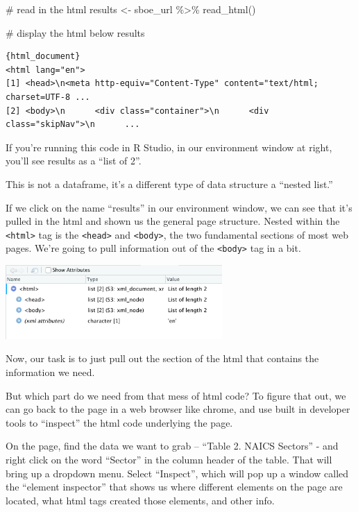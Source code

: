 \documentclass[
  letterpaper,
  DIV=11,
  numbers=noendperiod]{scrreprt}
\newenvironment{Shaded}{\begin{snugshade}}{\end{snugshade}}
\newcommand{\CommentTok}[1]{\textcolor[rgb]{0.37,0.37,0.37}{#1}}
\newcommand{\FunctionTok}[1]{\textcolor[rgb]{0.28,0.35,0.67}{#1}}
\newcommand{\NormalTok}[1]{\textcolor[rgb]{0.00,0.23,0.31}{#1}}
\newcommand{\OtherTok}[1]{\textcolor[rgb]{0.00,0.23,0.31}{#1}}
\newcommand{\SpecialCharTok}[1]{\textcolor[rgb]{0.37,0.37,0.37}{#1}}
\begin{document}
\begin{Shaded}
\begin{Highlighting}[]
\CommentTok{\# read in the html}
\NormalTok{results }\OtherTok{\textless{}{-}}\NormalTok{ sboe\_url }\SpecialCharTok{\%\textgreater{}\%}
  \FunctionTok{read\_html}\NormalTok{()}

\CommentTok{\# display the html below}
\NormalTok{results}
\end{Highlighting}
\end{Shaded}

\begin{verbatim}
{html_document}
<html lang="en">
[1] <head>\n<meta http-equiv="Content-Type" content="text/html; charset=UTF-8 ...
[2] <body>\n      <div class="container">\n      <div class="skipNav">\n      ...
\end{verbatim}

If you're running this code in R Studio, in our environment window at
right, you'll see results as a ``list of 2''.

This is not a dataframe, it's a different type of data structure a
``nested list.''

If we click on the name ``results'' in our environment window, we can
see that it's pulled in the html and shown us the general page
structure. Nested within the \texttt{\textless{}html\textgreater{}} tag
is the \texttt{\textless{}head\textgreater{}} and
\texttt{\textless{}body\textgreater{}}, the two fundamental sections of
most web pages. We're going to pull information out of the
\texttt{\textless{}body\textgreater{}} tag in a bit.

\includegraphics[width=3.25in,height=\textheight]{./images/rvest3.png}

Now, our task is to just pull out the section of the html that contains
the information we need.

But which part do we need from that mess of html code? To figure that
out, we can go back to the page in a web browser like chrome, and use
built in developer tools to ``inspect'' the html code underlying the
page.

On the page, find the data we want to grab -- ``Table 2. NAICS Sectors''
- and right click on the word ``Sector'' in the column header of the
table. That will bring up a dropdown menu. Select ``Inspect'', which
will pop up a window called the ``element inspector'' that shows us
where different elements on the page are located, what html tags created
those elements, and other info.
\end{document}
